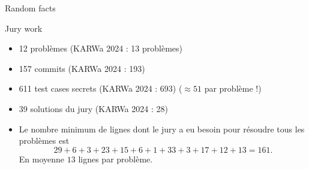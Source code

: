 
\begin{frame}{Random facts}
    \begin{block}{Jury work}
      \begin{itemize}[<+->]
        \item 12 problèmes (KARWa 2024 : 13 problèmes)
        \item 157 commits (KARWa 2024 : 193)
        \item 611 test cases secrets (KARWa 2024 : 693) ($\approx 51$ par problème !)
        \item 39 solutions du jury (KARWa 2024 : 28)
        \item Le nombre minimum de lignes dont le jury a eu besoin pour résoudre tous les problèmes est
        \[ 29+6+3+23+15+6+1+33+3+17+12+13 = 161. \]
        En moyenne $13$ lignes par problème.
      \end{itemize}
    \end{block}
\end{frame}
